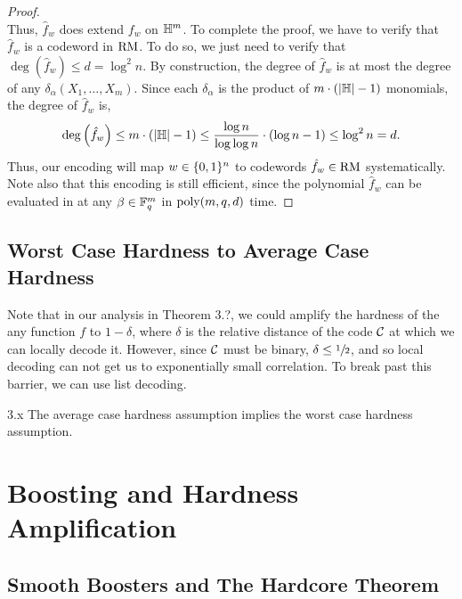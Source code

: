 \documentclass[11pt]{article}
\begin{document}
\begin{proof}
\begin{equation*}
    \end{equation*}
    Thus, $\hat{f}_w$ does extend $f_w$ on $\mathbb{H}^m$. To complete the proof, we have to verify that $\hat{f}_w$ is a codeword in $\mathrm{RM}$. To do so, we just need to verify that $\deg(\hat{f}_w) \leq d = \log^2 n$. By construction, the degree of $\hat{f}_w$ is at most the degree of any $\delta_\alpha(X_1, \ldots, X_m)$. Since each $\delta_\alpha$ is the product of $m \cdot (|\mathbb{H}| - 1)$ monomials, the degree of $\hat{f}_w$ is,
    \begin{equation*}
        \deg \left(\hat{f}_w\right) \leq m \cdot (|\mathbb{H}| - 1) \leq \frac{\log n}{\log \log n} \cdot \left(\log n - 1\right) \leq \log^2 n = d.
    \end{equation*}
    Thus, our encoding will map $w \in \{0, 1\}^n$ to codewords $\hat{f}_w \in \mathrm{RM}$ systematically. Note also that this encoding is still efficient, since the polynomial $\hat{f}_w$ can be evaluated in at any $\beta \in \mathbb{F}_q^m$ in $\mathrm{poly}(m, q, d)$ time.
\end{proof}

\subsection{Worst Case Hardness to Average Case Hardness}

Note that in our analysis in Theorem 3.?, we could amplify the hardness of the any function $f$ to $1 - \delta$, where $\delta$ is the relative distance of the code $\mathcal{C}$ at which we can locally decode it. However, since $\mathcal{C}$ must be binary, $\delta \leq \sfrac{1}{2}$, and so local decoding can not get us to exponentially small correlation. To break past this barrier, we can use list decoding. 

\begin{theorem}{3.x}
    The average case hardness assumption implies the worst case hardness assumption.
\end{theorem}



\section{Boosting and Hardness Amplification}

\subsection{Smooth Boosters and The Hardcore Theorem}
\end{document}
